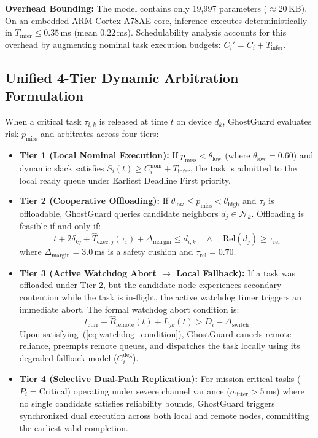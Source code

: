 \documentclass[10pt,conference]{IEEEtran}
\begin{document}
\textbf{Overhead Bounding:} The model contains only 19,997 parameters ($\approx 20$\,KB). On an embedded ARM Cortex-A78AE core, inference executes deterministically in $T_{\text{infer}} \le 0.35$\,ms (mean $0.22$\,ms). Schedulability analysis accounts for this overhead by augmenting nominal task execution budgets: $C_i' = C_i + T_{\text{infer}}$.

\subsection{Unified 4-Tier Dynamic Arbitration Formulation}
When a critical task $\tau_{i,k}$ is released at time $t$ on device $d_k$, GhostGuard evaluates risk $p_{\text{miss}}$ and arbitrates across four tiers:

\begin{itemize}
    \item \textbf{Tier 1 (Local Nominal Execution):} If $p_{\text{miss}} < \theta_{\text{low}}$ (where $\theta_{\text{low}} = 0.60$) and dynamic slack satisfies $S_i(t) \ge C_i^{\text{nom}} + T_{\text{infer}}$, the task is admitted to the local ready queue under Earliest Deadline First priority.
    \item \textbf{Tier 2 (Cooperative Offloading):} If $\theta_{\text{low}} \le p_{\text{miss}} < \theta_{\text{high}}$ and $\tau_i$ is offloadable, GhostGuard queries candidate neighbors $d_j \in \mathcal{N}_k$. Offloading is feasible if and only if:
    \begin{equation}
        t + 2\delta_{kj} + \hat{T}_{\text{exec}, j}(\tau_i) + \Delta_{\text{margin}} \le d_{i,k} \quad \land \quad \text{Rel}(d_j) \ge \tau_{\text{rel}}
        \label{eq:offload_feasibility}
    \end{equation}
    where $\Delta_{\text{margin}} = 3.0$\,ms is a safety cushion and $\tau_{\text{rel}} = 0.70$.
    \item \textbf{Tier 3 (Active Watchdog Abort $\to$ Local Fallback):} If a task was offloaded under Tier 2, but the candidate node experiences secondary contention while the task is in-flight, the active watchdog timer triggers an immediate abort. The formal watchdog abort condition is:
    \begin{equation}
        t_{\text{curr}} + \hat{R}_{\text{remote}}(t) + L_{jk}(t) > D_i - \Delta_{\text{switch}}
        \label{eq:watchdog_condition}
    \end{equation}
    Upon satisfying~(\ref{eq:watchdog_condition}), GhostGuard cancels remote reliance, preempts remote queues, and dispatches the task locally using its degraded fallback model ($C_i^{\text{deg}}$).
    \item \textbf{Tier 4 (Selective Dual-Path Replication):} For mission-critical tasks ($P_i = \text{Critical}$) operating under severe channel variance ($\sigma_{\text{jitter}} > 5$\,ms) where no single candidate satisfies reliability bounds, GhostGuard triggers synchronized dual execution across both local and remote nodes, committing the earliest valid completion.
\end{itemize}
\end{document}

